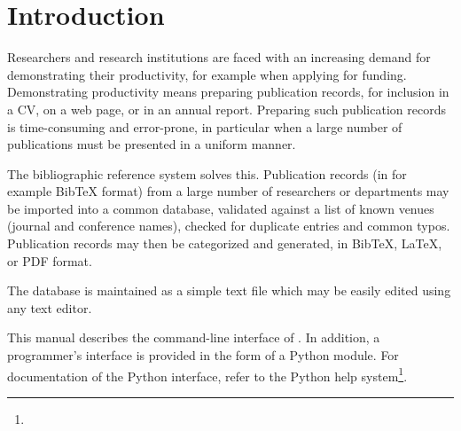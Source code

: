 \chapter{Introduction}

Researchers and research institutions are faced with an increasing
demand for demonstrating their productivity, for example when applying
for funding. Demonstrating productivity means preparing publication
records, for inclusion in a CV, on a web page, or in an annual
report. Preparing such publication records is time-consuming and
error-prone, in particular when a large number of publications must be
presented in a uniform manner.

The bibliographic reference system \package{} solves this. Publication
records (in for example BibTeX format) from a large number of
researchers or departments may be imported into a common database,
validated against a list of known venues (journal and conference
names), checked for duplicate entries and common typos.  Publication
records may then be categorized and generated, in BibTeX, \LaTeX, or
PDF format.

The database is maintained as a simple text file which may be easily
edited using any text editor.

This manual describes the command-line interface of \package{}. In
addition, a programmer's interface is provided in the form of a Python
module. For documentation of the Python interface, refer to the Python
help system\footnote{}.
